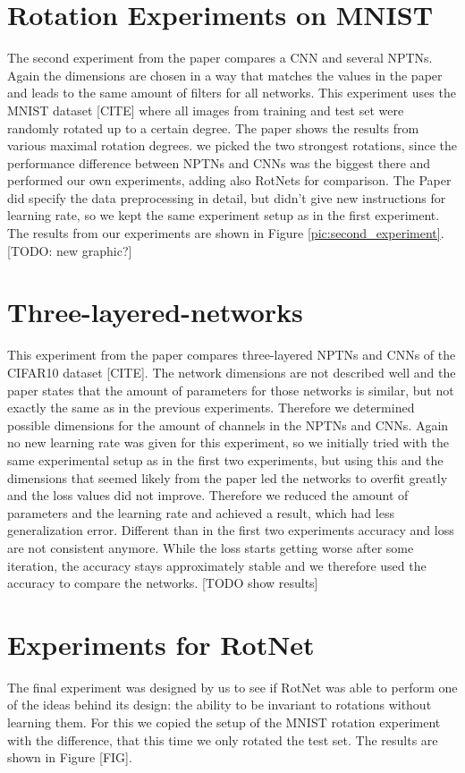 \documentclass{llncs}
\begin{document}
\section{Rotation Experiments on MNIST}
The second experiment from the paper compares a CNN and several NPTNs. Again the dimensions are chosen in a way that matches the values in the paper and leads to the same amount of filters for all networks. 
This experiment uses the MNIST dataset [CITE] where all images from training and test set were randomly rotated up to a certain degree. 
The paper shows the results from various maximal rotation degrees. we picked the two strongest rotations, since the performance difference between NPTNs and CNNs was the biggest there and performed our own experiments, adding also RotNets for comparison.
The Paper did specify the data preprocessing in detail, but didn't give new instructions for learning rate, so we kept the same experiment setup as in the first experiment.
The results from our experiments are shown in Figure \ref{pic:second_experiment}. [TODO: new graphic?]


\section{Three-layered-networks}
This experiment from the paper compares three-layered NPTNs and CNNs of the CIFAR10 dataset [CITE]. 
The network dimensions are not described well and the paper states that the amount of parameters for those networks is similar, but not exactly the same as in the previous experiments. 
Therefore we determined possible dimensions for the amount of channels in the NPTNs and CNNs. 
Again no new learning rate was given for this experiment, so we initially tried with the same experimental setup as in the first two experiments, but using this and the dimensions that seemed likely from the paper led the networks to overfit greatly and the loss values did not improve. 
Therefore we reduced the amount of parameters and the learning rate and achieved a result, which had less generalization error. 
Different than in the first two experiments accuracy and loss are not consistent anymore. While the loss starts getting worse after some iteration, the accuracy stays approximately stable and we therefore used the accuracy to compare the networks.
[TODO show results]

\section{Experiments for RotNet}
The final experiment was designed by us to see if RotNet was able to perform one of the ideas behind its design: the ability to be invariant to rotations without learning them. For this we copied the setup of the MNIST rotation experiment with the difference, that this time we only rotated the test set. The results are shown in Figure [FIG]. 
\end{document}
